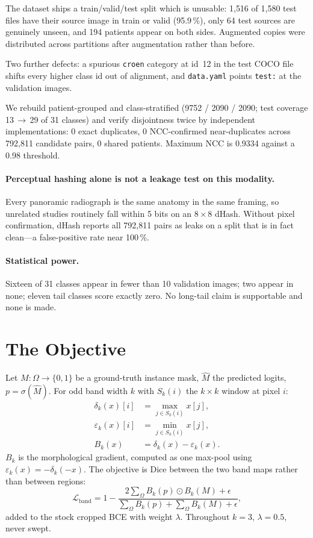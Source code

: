 \documentclass[11pt,letterpaper]{article}
\begin{document}
The dataset ships a train/valid/test split which is unusable: 1{,}516 of 1{,}580
test files have their source image in train or valid (95.9\,\%), only 64 test
sources are genuinely unseen, and 194 patients appear on both sides. Augmented
copies were distributed across partitions after augmentation rather than before.

Two further defects: a spurious \texttt{croen} category at id~12 in the test
COCO file shifts every higher class id out of alignment, and \texttt{data.yaml}
points \texttt{test:} at the validation images.

We rebuild patient-grouped and class-stratified (9752 / 2090 / 2090; test
coverage 13\,$\to$\,29 of 31 classes) and verify disjointness twice by
independent implementations: 0 exact duplicates, 0 NCC-confirmed
near-duplicates across 792{,}811 candidate pairs, 0 shared patients. Maximum NCC
is 0.9334 against a 0.98 threshold.

\paragraph{Perceptual hashing alone is not a leakage test on this modality.}
Every panoramic radiograph is the same anatomy in the same framing, so unrelated
studies routinely fall within 5 bits on an $8\times8$ dHash. Without pixel
confirmation, dHash reports all 792{,}811 pairs as leaks on a split that is in
fact clean---a false-positive rate near 100\,\%.

\paragraph{Statistical power.}
Sixteen of 31 classes appear in fewer than 10 validation images; two appear in
none; eleven tail classes score exactly zero. No long-tail claim is supportable
and none is made.

\section{The Objective}

Let $M:\Omega\to\{0,1\}$ be a ground-truth instance mask, $\hat{M}$ the predicted
logits, $p=\sigma(\hat{M})$. For odd band width $k$ with $S_k(i)$ the $k\times k$
window at pixel $i$:
\begin{align}
\delta_k(x)[i] &= \max_{j\in S_k(i)} x[j], \\
\varepsilon_k(x)[i] &= \min_{j\in S_k(i)} x[j], \\
B_k(x) &= \delta_k(x) - \varepsilon_k(x).
\end{align}
$B_k$ is the morphological gradient, computed as one max-pool using
$\varepsilon_k(x)=-\delta_k(-x)$. The objective is Dice between the two band maps
rather than between regions:
\begin{equation}
\mathcal{L}_{\mathrm{band}} = 1 - \frac{2\sum_\Omega B_k(p)\odot B_k(M) + \epsilon}
{\sum_\Omega B_k(p) + \sum_\Omega B_k(M) + \epsilon},
\end{equation}
added to the stock cropped BCE with weight $\lambda$. Throughout $k=3$,
$\lambda=0.5$, never swept.
\end{document}
